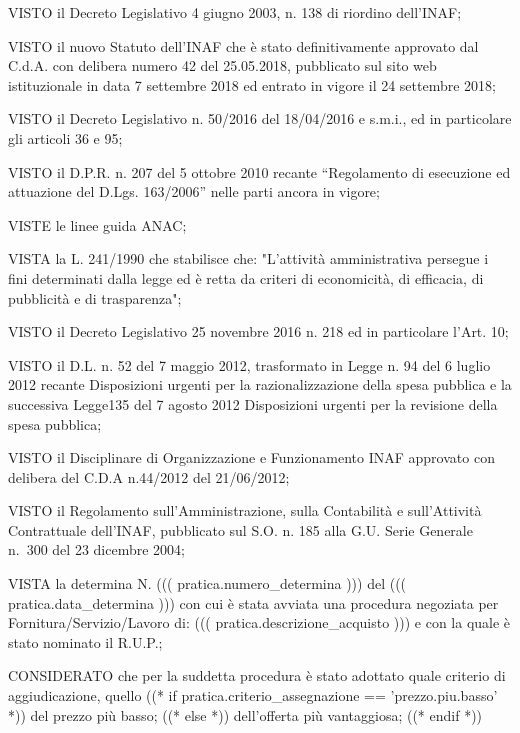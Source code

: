 \documentclass[a4paper,12pt]{letter}
\begin{document}
\begin{list}{RISCONTRATA}{}


\item[VISTO] il Decreto Legislativo 4 giugno 2003, n. 138 di riordino dell'INAF;
\item[VISTO] il nuovo Statuto dell'INAF che è stato definitivamente approvato dal
             C.d.A. con delibera numero 42 del 25.05.2018, pubblicato sul sito web
             istituzionale in data 7 settembre 2018 ed entrato in vigore il 24 settembre 2018;
\item[VISTO]  il Decreto Legislativo n. 50/2016 del 18/04/2016 e s.m.i., ed in particolare
             gli articoli 36 e 95;
\item[VISTO] il D.P.R. n. 207 del 5 ottobre 2010 recante “Regolamento di esecuzione
             ed attuazione del D.Lgs. 163/2006” nelle parti ancora in vigore;
\item[VISTE] le linee guida ANAC;
\item[VISTA]  la L. 241/1990 che stabilisce che: "L'attività amministrativa persegue
             i fini determinati dalla legge ed è retta da criteri di economicità, di
             efficacia, di pubblicità e di trasparenza";
\item[VISTO]  il Decreto Legislativo 25 novembre 2016 n. 218 ed in particolare l'Art. 10;
\item[VISTO]  il D.L. n. 52 del 7 maggio 2012, trasformato in Legge n. 94 del 6 luglio
             2012 recante Disposizioni urgenti per la razionalizzazione della spesa
             pubblica e la successiva Legge135 del 7 agosto 2012 Disposizioni urgenti per
             la revisione della spesa pubblica;
\item[VISTO] il Disciplinare di Organizzazione e Funzionamento INAF approvato con delibera
             del C.D.A n.44/2012 del 21/06/2012;
\item[VISTO] il Regolamento sull'Amministrazione, sulla Contabilità e sull'Attività
             Contrattuale dell'INAF, pubblicato sul S.O. n. 185 alla G.U. Serie Generale
             n.~300 del 23 dicembre 2004;
\item[VISTA] la determina N. ((( pratica.numero_determina ))) del ((( pratica.data_determina )))
             con cui è stata avviata una procedura negoziata per Fornitura/Servizio/Lavoro di:
             ((( pratica.descrizione_acquisto ))) e con la quale è stato nominato il R.U.P.;
\item[CONSIDERATO]  che per la suddetta procedura è stato adottato quale criterio di
              aggiudicazione, quello %
((* if pratica.criterio_assegnazione == 'prezzo.piu.basso' *)) %
  del prezzo più basso;
((* else *)) %
  dell'offerta più vantaggiosa;
((* endif *))


\end{list}
\end{document}
